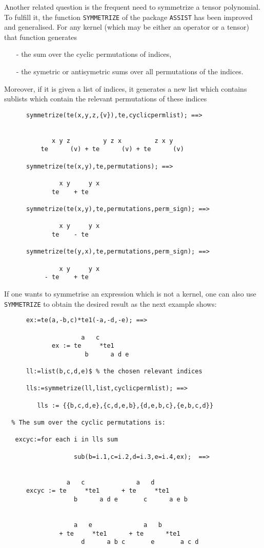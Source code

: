 Another related question is the frequent need to symmetrize
a tensor polynomial.
To fulfill it, the function \texttt{SYMMETRIZE}
of the package \texttt{ASSIST}  has been improved and
generalised. For any kernel (which may be either
an operator or a tensor) that function generates
\begin{itemize}
\item[-] the sum over the cyclic permutations of indices,
\item[-] the symetric or antisymetric sums over all permutations
of the  indices.
\end{itemize}
Moreover, if it is given a list of indices, it generates a new list
which contains sublists which contain  the relevant permutations of
these indices
\begin{verbatim}
      symmetrize(te(x,y,z,{v}),te,cyclicpermlist); ==>


             x y z         y z x         z x y
          te      (v) + te      (v) + te      (v)

      symmetrize(te(x,y),te,permutations); ==>

               x y     y x
             te    + te

      symmetrize(te(x,y),te,permutations,perm_sign); ==>

               x y     y x
             te    - te

      symmetrize(te(y,x),te,permutations,perm_sign); ==>

               x y     y x
           - te    + te
\end{verbatim}
If one wants to symmetrise an expression which is not a kernel, one
can also use \texttt{SYMMETRIZE} to obtain the desired result as the next
example shows:
\begin{verbatim}
      ex:=te(a,-b,c)*te1(-a,-d,-e); ==>

                     a   c
             ex := te     *te1
                      b      a d e

      ll:=list(b,c,d,e)$ % the chosen relevant indices

      lls:=symmetrize(ll,list,cyclicpermlist); ==>

         lls := {{b,c,d,e},{c,d,e,b},{d,e,b,c},{e,b,c,d}}

  % The sum over the cyclic permutations is:

   excyc:=for each i in lls sum

                   sub(b=i.1,c=i.2,d=i.3,e=i.4,ex);  ==>


                 a   c              a   d
      excyc := te     *te1      + te     *te1
                   b      a d e       c      a e b


                   a   e              a   b
               + te     *te1      + te      *te1
                     d      a b c       e       a c d
\end{verbatim}

